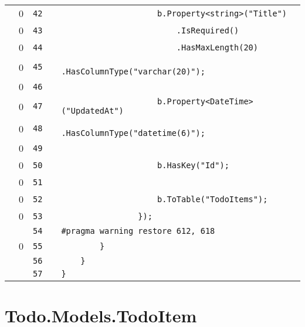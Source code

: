 \documentclass[a4paper,landscape,10pt]{article}
\begin{document}
\begin{longtable}[l]{lrrll}
\cellcolor{red} & 0 & \verb~42~ & & \verb~                    b.Property<string>("Title")~\\
\cellcolor{red} & 0 & \verb~43~ & & \verb~                        .IsRequired()~\\
\cellcolor{red} & 0 & \verb~44~ & & \verb~                        .HasMaxLength(20)~\\
\cellcolor{red} & 0 & \verb~45~ & & \verb~                        .HasColumnType("varchar(20)");~\\
\cellcolor{red} & 0 & \verb~46~ & & \verb~~\\
\cellcolor{red} & 0 & \verb~47~ & & \verb~                    b.Property<DateTime>("UpdatedAt")~\\
\cellcolor{red} & 0 & \verb~48~ & & \verb~                        .HasColumnType("datetime(6)");~\\
\cellcolor{red} & 0 & \verb~49~ & & \verb~~\\
\cellcolor{red} & 0 & \verb~50~ & & \verb~                    b.HasKey("Id");~\\
\cellcolor{red} & 0 & \verb~51~ & & \verb~~\\
\cellcolor{red} & 0 & \verb~52~ & & \verb~                    b.ToTable("TodoItems");~\\
\cellcolor{red} & 0 & \verb~53~ & & \verb~                });~\\
\cellcolor{gray} &  & \verb~54~ & & \verb~#pragma warning restore 612, 618~\\
\cellcolor{red} & 0 & \verb~55~ & & \verb~        }~\\
\cellcolor{gray} &  & \verb~56~ & & \verb~    }~\\
\cellcolor{gray} &  & \verb~57~ & & \verb~}~\\
\end{longtable}
\newpage
\section{Todo.Models.TodoItem}
\end{document}
